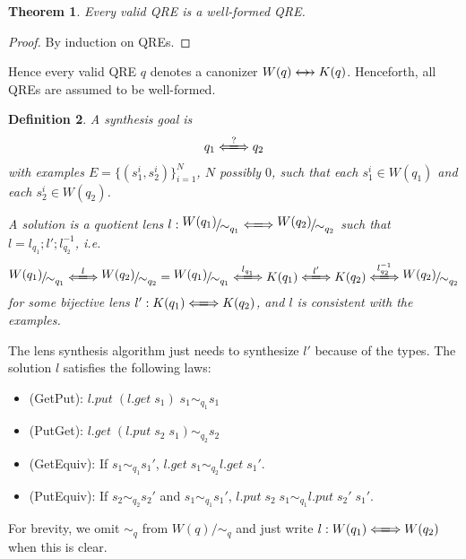 \documentclass[a4paper,11pt] {article}
\theoremstyle{plain}
\newtheorem{theorem}{Theorem}[section]
\newtheorem{definition}[theorem]{Definition}
\newcommand{\negjoinrel}{\mathrel{\mkern3mu}}
\newcommand{\rlaprel}[1]{\mathrel{\mathrlap{#1}}}
\newcommand{\lget}[1]{\textit{$#1$.get}}
\newcommand{\lput}[1]{\textit{$#1$.put}}
\newcommand{\lcreate}[1]{\textit{$#1$.create}}
\newcommand{\canon}{\rlaprel{\longleftarrow}\rlaprel{\longrightarrow}
  \negjoinrel\rightarrow\;\,}
\newcommand{\lensbetween}[1]{\xLongleftrightarrow{#1}}
\newcommand{\name}[1]{\textsf{#1}}
\newcommand{\niceFrac}[2]{%
    \raise.5ex\hbox{$#1$}%
    \kern-.1em/\kern-.15em%
    \lower.25ex\hbox{$#2$}}
\begin{document}
\begin{theorem}
  Every valid QRE is a well-formed QRE.
\end{theorem}
\begin{proof}
  By induction on QREs.
\end{proof}
Hence every valid QRE $q$ denotes a canonizer $W(q) \canon K(q)$.
Henceforth, all QREs are assumed to be well-formed.
\begin{definition}
  A synthesis goal is 
  \begin{align*}
    q_1 \lensbetween{?} q_2
  \end{align*}
  with examples
  $E = \{(s_1^i, s_2^i)\}_{i=1}^N$, $N$ possibly $0$,
  such that each $s_1^i \in W(q_1)$ and each $s_2^i \in W(q_2)$.
  
  A solution is a quotient lens
  $l: \niceFrac{W(q_1)}{\sim_{q_1}} \lensbetween{} \niceFrac{W(q_2)}{\sim_{q_2}}$
  such that $l = l_{q_1} ; l' ; l_{q_2}^{-1}$, i.e.
  \begin{align*}
    \niceFrac{W(q_1)}{\sim_{q_1}} \lensbetween{l} \niceFrac{W(q_2)}{\sim_{q_2}}
    = \niceFrac{W(q_1)}{\sim_{q_1}} \lensbetween{l_{q_1}} K(q_1) \lensbetween{l'} K(q_2)
    \lensbetween{l_{q_2}^{-1}} \niceFrac{W(q_2)}{\sim_{q_2}}
  \end{align*}
  for some bijective lens
  $l': K(q_1) \lensbetween{} K(q_2)$, and 
  $l$ is consistent with the examples.
\end{definition}
The lens synthesis algorithm just needs to synthesize $l'$
because of the types. The solution $l$ satisfies the following laws:
\begin{itemize}
\item (\name{GetPut}): $\lput{l} \; (\lget{l} \; s_1) \; s_1 \sim_{q_1} s_1$ 
\item (\name{PutGet}): $\lget{l} \; (\lput{l} \; s_2 \; s_1) \sim_{q_2} s_2$
\item (\name{GetEquiv}): If $s_1 \sim_{q_1} s_1'$, $\lget{l} \; s_1
  \sim_{q_2} \lget{l} \; s_1'$.
\item (\name{PutEquiv}): If $s_2 \sim_{q_2} s_2'$ and $s_1 \sim_{q_1} s_1'$,
  $\lput{l} \; s_2 \; s_1 \sim_{q_1} \lput{l} \; s_2' \; s_1'$.
\end{itemize}
For brevity, we omit $\sim_{q}$ from $W(q)/\sim_{q}$ and just write
$l: W(q_1) \lensbetween{} W(q_2)$ when this is clear.
\end{document}
